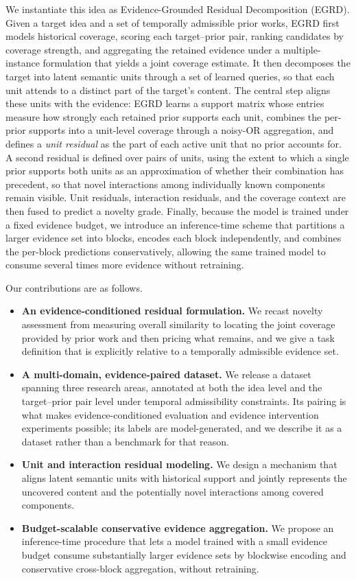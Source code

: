 We instantiate this idea as Evidence-Grounded Residual Decomposition (EGRD).
Given a target idea and a set of temporally admissible prior works, EGRD first
models historical coverage, scoring each target--prior pair, ranking candidates
by coverage strength, and aggregating the retained evidence under a
multiple-instance formulation that yields a joint coverage estimate. It then
decomposes the target into latent semantic units through a set of learned
queries, so that each unit attends to a distinct part of the target's content.
The central step aligns these units with the evidence: EGRD learns a support
matrix whose entries measure how strongly each retained prior supports each
unit, combines the per-prior supports into a unit-level coverage through a
noisy-OR aggregation, and defines a \emph{unit residual} as the part of each
active unit that no prior accounts for. A second residual is defined over pairs
of units, using the extent to which a single prior supports both units as an
approximation of whether their combination has precedent, so that novel
interactions among individually known components remain visible. Unit
residuals, interaction residuals, and the coverage context are then fused to
predict a novelty grade. Finally, because the model is trained under a fixed
evidence budget, we introduce an inference-time scheme that partitions a larger
evidence set into blocks, encodes each block independently, and combines the
per-block predictions conservatively, allowing the same trained model to
consume several times more evidence without retraining.

Our contributions are as follows.
\begin{itemize}
  \item \textbf{An evidence-conditioned residual formulation.} We recast
  novelty assessment from measuring overall similarity to locating the joint
  coverage provided by prior work and then pricing what remains, and we give a
  task definition that is explicitly relative to a temporally admissible
  evidence set.
  \item \textbf{A multi-domain, evidence-paired dataset.} We release a dataset
  spanning three research areas, annotated at both the idea level and the
  target--prior pair level under temporal admissibility constraints. Its
  pairing is what makes evidence-conditioned evaluation and evidence
  intervention experiments possible; its labels are model-generated, and we
  describe it as a dataset rather than a benchmark for that reason.
  \item \textbf{Unit and interaction residual modeling.} We design a mechanism
  that aligns latent semantic units with historical support and jointly
  represents the uncovered content and the potentially novel interactions among
  covered components.
  \item \textbf{Budget-scalable conservative evidence aggregation.} We propose
  an inference-time procedure that lets a model trained with a small evidence
  budget consume substantially larger evidence sets by blockwise encoding and
  conservative cross-block aggregation, without retraining.
\end{itemize}


